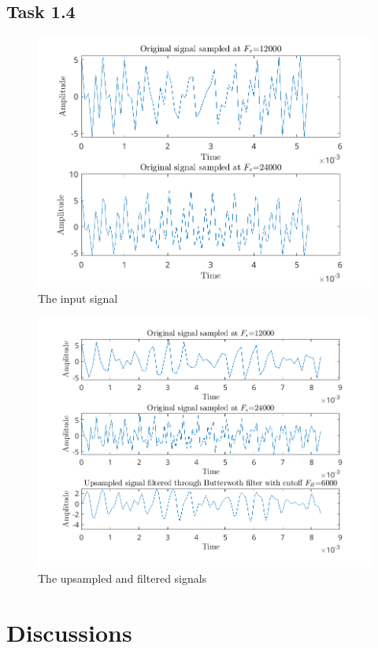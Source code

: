 \documentclass{article}
\begin{document}
\subsection{Task 1.4}
\begin{figure}[!ht]
    \caption{The input signal}
    \includegraphics[width=\textwidth]{Ass1da.png}
\end{figure}

\begin{figure}[!ht]
    \caption{The upsampled and filtered signals}
    \includegraphics[width=\textwidth]{Ass1db.png}
\end{figure}

\newpage

\section{Discussions}
\end{document}
